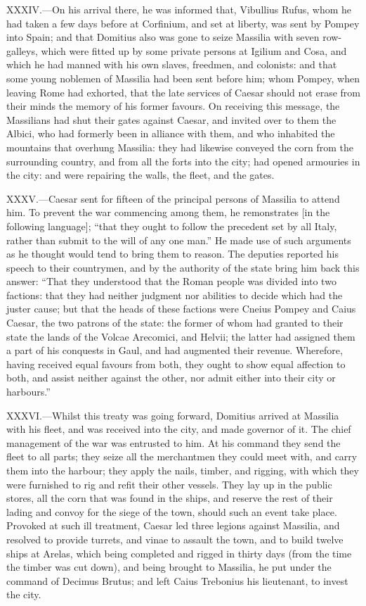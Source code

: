 XXXIV.—On his arrival there, he was informed that, Vibullius Rufus,
whom he had taken a few days before at Corfinium, and set at liberty,
was sent by Pompey into Spain; and that Domitius also was gone to seize
Massilia with seven row-galleys, which were fitted up by some private
persons at Igilium and Cosa, and which he had manned with his own
slaves, freedmen, and colonists: and that some young noblemen of
Massilia had been sent before him; whom Pompey, when leaving Rome had
exhorted, that the late services of Caesar should not erase from their
minds the memory of his former favours. On receiving this message, the
Massilians had shut their gates against Caesar, and invited over to them
the Albici, who had formerly been in alliance with them, and who
inhabited the mountains that overhung Massilia: they had likewise
conveyed the corn from the surrounding country, and from all the forts
into the city; had opened armouries in the city: and were repairing the
walls, the fleet, and the gates.

XXXV.—Caesar sent for fifteen of the principal persons of Massilia to
attend him. To prevent the war commencing among them, he remonstrates
[in the following language]; ``that they ought to follow the precedent
set by all Italy, rather than submit to the will of any one man.'' He
made use of such arguments as he thought would tend to bring them to
reason. The deputies reported his speech to their countrymen, and by the
authority of the state bring him back this answer: ``That they understood
that the Roman people was divided into two factions: that they had
neither judgment nor abilities to decide which had the juster cause; but
that the heads of these factions were Cneius Pompey and Caius Caesar,
the two patrons of the state: the former of whom had granted to their
state the lands of the Volcae Arecomici, and Helvii; the latter had
assigned them a part of his conquests in Gaul, and had augmented their
revenue. Wherefore, having received equal favours from both, they ought
to show equal affection to both, and assist neither against the other,
nor admit either into their city or harbours.''

XXXVI.—Whilst this treaty was going forward, Domitius arrived at
Massilia with his fleet, and was received into the city, and made
governor of it. The chief management of the war was entrusted to him. At
his command they send the fleet to all parts; they seize all the
merchantmen they could meet with, and carry them into the harbour; they
apply the nails, timber, and rigging, with which they were furnished to
rig and refit their other vessels. They lay up in the public stores, all
the corn that was found in the ships, and reserve the rest of their
lading and convoy for the siege of the town, should such an event take
place. Provoked at such ill treatment, Caesar led three legions against
Massilia, and resolved to provide turrets, and vinae to assault the
town, and to build twelve ships at Arelas, which being completed and
rigged in thirty days (from the time the timber was cut down), and being
brought to Massilia, he put under the command of Decimus Brutus; and
left Caius Trebonius his lieutenant, to invest the city.

